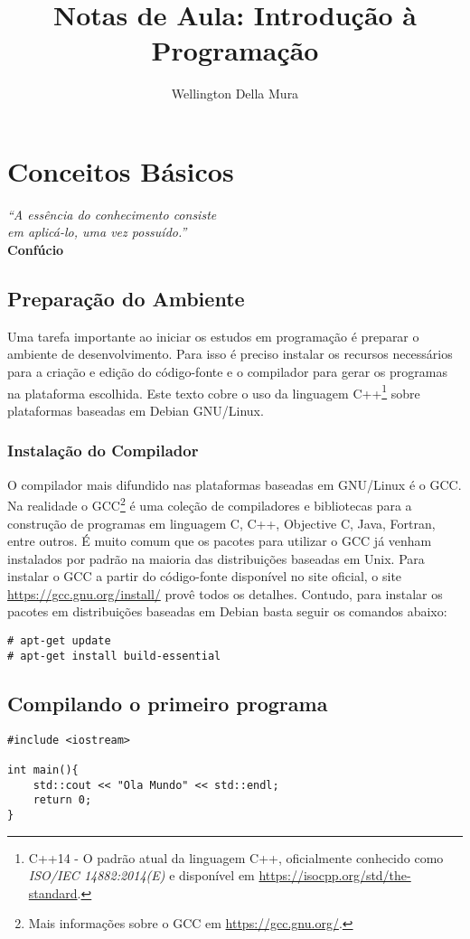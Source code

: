 \documentclass[12pt,a4paper,oneside]{book}
\author{Wellington Della Mura}
\title{Notas de Aula: Introdução à Programação}
\begin{document}
	\maketitle

\chapter{Conceitos Básicos}

\begin{flushright}
	\textit{``A essência do conhecimento consiste \\ em aplicá-lo, uma vez possuído.''} \\
	\textbf{Confúcio}
\end{flushright}

\section{Preparação do Ambiente}
Uma tarefa importante ao iniciar os estudos em programação é preparar o ambiente de desenvolvimento.
Para isso é preciso instalar os recursos necessários para a criação e edição do código-fonte e o compilador para gerar os programas na plataforma escolhida.
Este texto cobre o uso da linguagem C++\footnote{C++14 - O padrão atual da linguagem C++, oficialmente conhecido como \textit{ISO/IEC 14882:2014(E)} e disponível em \url{https://isocpp.org/std/the-standard}.} sobre plataformas baseadas em Debian GNU/Linux.

\subsection{Instalação do Compilador}
O compilador mais difundido nas plataformas baseadas em GNU/Linux é o GCC.
Na realidade o GCC\footnote{Mais informações sobre o GCC em \url{https://gcc.gnu.org/}.} é uma coleção de compiladores e bibliotecas para a construção de programas em linguagem C, C++, Objective C, Java, Fortran, entre outros.
É muito comum que os pacotes para utilizar o GCC já venham instalados por padrão na maioria das distribuições baseadas em Unix.
Para instalar o GCC a partir do código-fonte disponível no site oficial, o site \url{https://gcc.gnu.org/install/} provê todos os detalhes.
Contudo, para instalar os pacotes em distribuições baseadas em Debian basta seguir os comandos abaixo:

\begin{lstlisting}
# apt-get update
# apt-get install build-essential
\end{lstlisting}


\section{Compilando o primeiro programa}

\lstset{language=C++}
\begin{lstlisting}
#include <iostream>

int main(){
    std::cout << "Ola Mundo" << std::endl;
    return 0;
}
\end{lstlisting}
\end{document}
